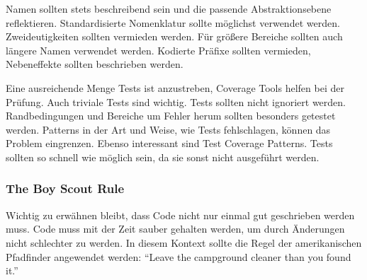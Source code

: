 Namen sollten stets beschreibend sein und die passende Abstraktionsebene reflektieren.
Standardisierte Nomenklatur sollte möglichst verwendet werden.
Zweideutigkeiten sollten vermieden werden.
Für größere Bereiche sollten auch längere Namen verwendet werden.
Kodierte Präfixe sollten vermieden, Nebeneffekte sollten beschrieben werden.

Eine ausreichende Menge Tests ist anzustreben, Coverage Tools helfen bei der Prüfung.
Auch triviale Tests sind wichtig.
Tests sollten nicht ignoriert werden.
Randbedingungen und Bereiche um Fehler herum sollten besonders getestet werden.
Patterns in der Art und Weise, wie Tests fehlschlagen, können das Problem eingrenzen.
Ebenso interessant sind Test Coverage Patterns.
Tests sollten so schnell wie möglich sein, da sie sonst nicht ausgeführt werden.

\subsubsection{The Boy Scout Rule}
Wichtig zu erwähnen bleibt, dass Code nicht nur einmal gut geschrieben werden muss.
Code muss mit der Zeit sauber gehalten werden, um durch Änderungen nicht schlechter zu werden.
In diesem Kontext sollte die Regel der amerikanischen Pfadfinder angewendet werden:
\enquote{Leave the campground cleaner than you found it.}
